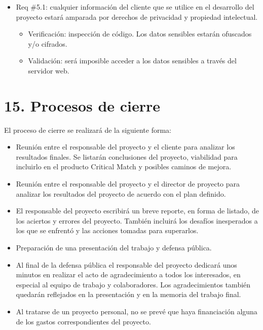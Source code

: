 \documentclass[
11pt, %
]{Clases/charter}
\begin{document}
\begin{itemize}
	\item Req \#5.1: cualquier información del cliente que se utilice en el desarrollo del proyecto estará amparada por derechos de privacidad y propiedad intelectual.
	      \begin{itemize}
		      \item Verificación: inspección de código. Los datos sensibles estarán ofuscados y/o cifrados.
		      \item Validación: será imposible acceder a los datos sensibles a través del servidor web.
	      \end{itemize}

\end{itemize}

\pagebreak

\section{15. Procesos de cierre}
\label{sec:cierre}
El proceso de cierre se realizará de la siguiente forma:

\begin{itemize}
	\item Reunión entre el responsable del proyecto y el cliente para analizar los resultados finales.
	      Se listarán conclusiones del proyecto, viabilidad para incluirlo en el producto Critical Match y posibles caminos de mejora.
	\item Reunión entre el responsable del proyecto y el director de proyecto para analizar los resultados del proyecto de acuerdo con el plan definido.
	\item El responsable del proyecto escribirá un breve reporte, en forma de listado, de los aciertos y errores del proyecto.
	      También incluirá los desafíos inesperados a los que se enfrentó y las acciones tomadas para superarlos.
	\item Preparación de una presentación del trabajo y defensa pública.
	\item Al final de la defensa pública el responsable del proyecto dedicará unos minutos en realizar el acto de agradecimiento a todos los interesados, en especial al equipo de trabajo y colaboradores.
	      Los agradecimientos también quedarán reflejados en la presentación y en la memoria del trabajo final.
	\item Al tratarse de un proyecto personal, no se prevé que haya financiación alguna de los gastos correspondientes del proyecto.
\end{itemize}
\end{document}
